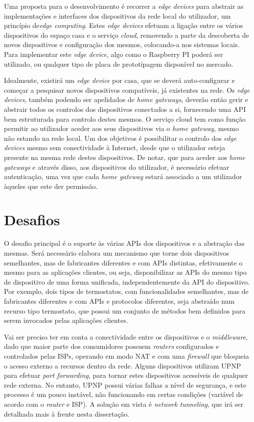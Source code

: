 Uma proposta para o desenvolvimento é recorrer a \textit{edge devices} para abstrair as implementações e interfaces dos dispositivos da rede local do utilizador, um princípio de\textit{edge computing}. Estes \textit{edge devices} efetuam a ligação entre os vários dispositivos do espaço casa e o serviço \textit{cloud}, removendo a parte da descoberta de novos dispositivos e configuração dos mesmos, colocando-a nos sistemas locais. Para implementar este \textit{edge device}, algo como o Raspberry PI poderá ser utilizado, ou qualquer tipo de placa de prototipagem disponível no mercado.

Idealmente, existirá um \textit{edge device} por casa, que se deverá auto-configurar e começar a pesquisar novos dispositivos compatíveis, já existentes na rede. Os \textit{edge devices}, também podendo ser apelidados de \textit{home gateways}, deverão então gerir e abstrair todos os controlos dos dispositivos conectados a si, fornecendo uma API bem estruturada para controlo destes mesmos. O serviço cloud tem como função permitir ao utilizador aceder aos seus dispositivos via o \textit{home gateway}, mesmo não estando na rede local. Um dos objetivos é possibilitar o controlo dos \textit{edge devices} mesmo sem conectividade à Internet, desde que o utilizador esteja presente na mesma rede destes dispositivos. De notar, que para aceder aos \textit{home gateways} e através disso, aos dispositivos do utilizador, é necessário efetuar autenticação, uma vez que cada \textit{home gateway} estará associado a um utilizador àqueles que este der permissão.

\section{Desafios}

O desafio principal é o suporte às várias APIs dos dispositivos e a abstração das mesmas. Será necessário elabora um mecanismo que torne dois dispositivos semelhantes, mas de fabricantes diferentes e com APIs distintas, efetivamente o mesmo para as aplicações clientes, ou seja, disponibilizar as APIs do mesmo tipo de dispositivo de uma forma unificada, independentemente da API do dispositivo. Por exemplo, dois tipos de termostatos, com funcionalidades semelhantes, mas de fabricantes diferentes e com APIs e protocolos diferentes, seja abstraído num recurso tipo termostato, que possui um conjunto de métodos bem definidos para serem invocados pelas aplicações clientes.

Vai ser preciso ter em conta a conectividade entre os dispositivos e o \textit{middleware}, dado que maior parte dos consumidores possuem \textit{routers} configurados e controlados pelas ISPs, operando em modo NAT e com uma \textit{firewall} que bloqueia o acesso externo a recursos dentro da rede. Alguns dispositivos utilizam UPNP para efetuar \textit{port forwarding}, para tornar estes dispositivos acessíveis de qualquer rede externa. No entanto, UPNP possui várias falhas a nível de segurança, e este processo é um pouco instável, não funcionando em certas condições (variável de acordo com o \textit{router} e ISP). A solução em vista é \textit{network tunneling}, que irá ser detalhada mais à frente nesta dissertação.

